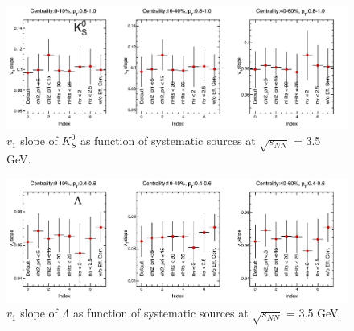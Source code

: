 \begin{figure}[hbt!]
\centering
\includegraphics[width=0.85\linewidth]{figures/chapter03/3p5gev_K0s_v1slopeIndex_sysUnc.pdf}
\caption{$v_1$ slope of $K^0_S$ as function of systematic sources at $\sqrt{s_{NN}}$ = 3.5 GeV.}
\label{fig:3p5gev_K0s_v1slopeIndex_sysUnc}
\end{figure}

\begin{figure}[hbt!]
\centering
\includegraphics[width=0.85\linewidth]{figures/chapter03/3p5gev_lam_v1slopeIndex_sysUnc.pdf}
\caption{$v_1$ slope of $\Lambda$ as function of systematic sources at $\sqrt{s_{NN}}$ = 3.5 GeV.}
\label{fig:3p5gev_lam_v1slopeIndex_sysUnc}
\end{figure}
